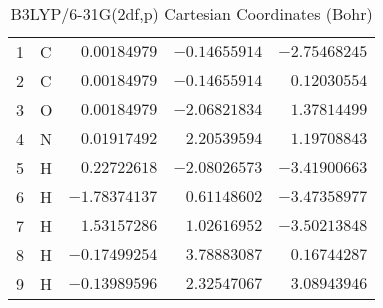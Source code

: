 \documentclass[10pt,oneside]{article}
\begin{document}
\begin{table}[h]
\centering
\caption{B3LYP/6-31G(2df,p) Cartesian Coordinates (Bohr)}
\begin{tabular}{llrrr}
\toprule
1  & C  & $ 0.00184979$ & $-0.14655914$ & $-2.75468245$ \\
2  & C  & $ 0.00184979$ & $-0.14655914$ & $ 0.12030554$ \\
3  & O  & $ 0.00184979$ & $-2.06821834$ & $ 1.37814499$ \\
4  & N  & $ 0.01917492$ & $ 2.20539594$ & $ 1.19708843$ \\
5  & H  & $ 0.22722618$ & $-2.08026573$ & $-3.41900663$ \\
6  & H  & $-1.78374137$ & $ 0.61148602$ & $-3.47358977$ \\
7  & H  & $ 1.53157286$ & $ 1.02616952$ & $-3.50213848$ \\
8  & H  & $-0.17499254$ & $ 3.78883087$ & $ 0.16744287$ \\
9  & H  & $-0.13989596$ & $ 2.32547067$ & $ 3.08943946$ \\
\bottomrule
\end{tabular}
\end{table}
\end{document}
